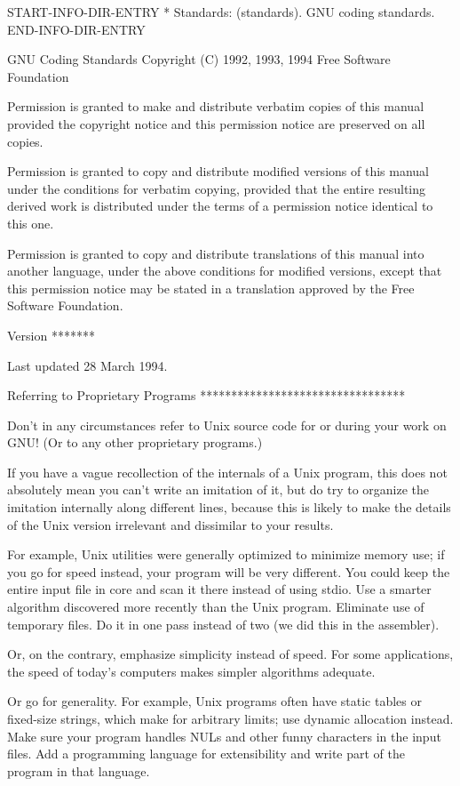 START-INFO-DIR-ENTRY
* Standards: (standards).        GNU coding standards.
END-INFO-DIR-ENTRY

   GNU Coding Standards Copyright (C) 1992, 1993, 1994 Free Software
Foundation

   Permission is granted to make and distribute verbatim copies of this
manual provided the copyright notice and this permission notice are
preserved on all copies.

   Permission is granted to copy and distribute modified versions of
this manual under the conditions for verbatim copying, provided that
the entire resulting derived work is distributed under the terms of a
permission notice identical to this one.

   Permission is granted to copy and distribute translations of this
manual into another language, under the above conditions for modified
versions, except that this permission notice may be stated in a
translation approved by the Free Software Foundation.

Version
*******

   Last updated 28 March 1994.

Referring to Proprietary Programs
*********************************

   Don't in any circumstances refer to Unix source code for or during
your work on GNU!  (Or to any other proprietary programs.)

   If you have a vague recollection of the internals of a Unix program,
this does not absolutely mean you can't write an imitation of it, but
do try to organize the imitation internally along different lines,
because this is likely to make the details of the Unix version
irrelevant and dissimilar to your results.

   For example, Unix utilities were generally optimized to minimize
memory use; if you go for speed instead, your program will be very
different.  You could keep the entire input file in core and scan it
there instead of using stdio.  Use a smarter algorithm discovered more
recently than the Unix program.  Eliminate use of temporary files.  Do
it in one pass instead of two (we did this in the assembler).

   Or, on the contrary, emphasize simplicity instead of speed.  For some
applications, the speed of today's computers makes simpler algorithms
adequate.

   Or go for generality.  For example, Unix programs often have static
tables or fixed-size strings, which make for arbitrary limits; use
dynamic allocation instead.  Make sure your program handles NULs and
other funny characters in the input files.  Add a programming language
for extensibility and write part of the program in that language.

